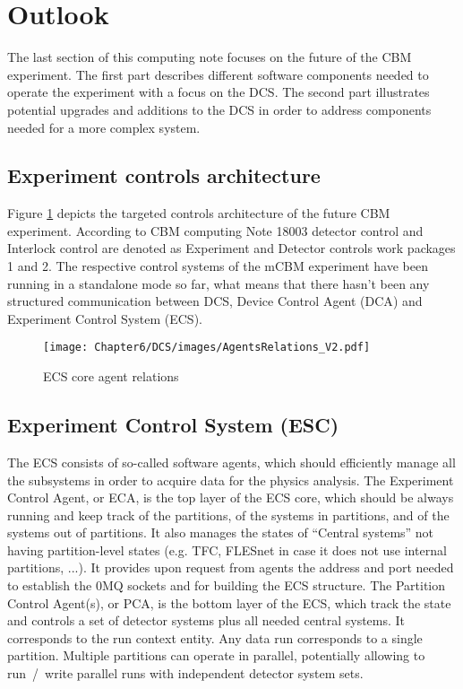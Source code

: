 \newpage
\section{Outlook}
The last section of this computing note focuses on the future of the CBM experiment. The first part describes different software components needed to operate the experiment with a focus on the \gls{DCS}. The second part illustrates potential upgrades and additions to the DCS in order to address components needed for a more complex system.
\subsection{Experiment controls architecture}
Figure \ref{fig_sim} depicts the targeted controls architecture of the future CBM experiment. According to CBM computing Note 18003 \cite{CBM_definitions} detector control and Interlock control are denoted as Experiment and Detector controls work packages 1 and 2. The respective control systems of the mCBM experiment have been running in a standalone mode so far, what means that there hasn't been any structured communication between DCS, Device Control Agent (\gls{DCA}) and Experiment Control System (\gls{ECS}).

\begin{figure}[h!]
\centering
\texttt{[image: Chapter6/DCS/images/AgentsRelations\_V2.pdf]}
\caption{ECS core agent relations}
\label{fig_sim}
\end{figure}

\subsection{Experiment Control System (ESC)}\label{sssAgents}
The ECS consists of so-called software agents, which should efficiently manage all the subsystems in order to acquire data for the physics analysis.
The Experiment Control Agent, or ECA, is the top layer of the ECS core, which should be always running and keep track of 
the partitions, of the systems in partitions, and of the systems out of partitions.  It also manages the states of ``Central systems'' not having partition-level states (e.g. TFC, FLESnet in case it does 
not use internal partitions, ...). It provides upon request from agents the address and port needed to establish the 0MQ sockets and for building the 
ECS structure. The Partition Control Agent(s), or PCA, is the bottom layer of the ECS, which track the state and controls a set of 
detector systems plus all needed central systems. It corresponds to the run context entity.  Any data run corresponds to a single partition. 
Multiple partitions can operate in parallel, potentially allowing to run~/~write parallel runs with independent 
detector system sets. 

